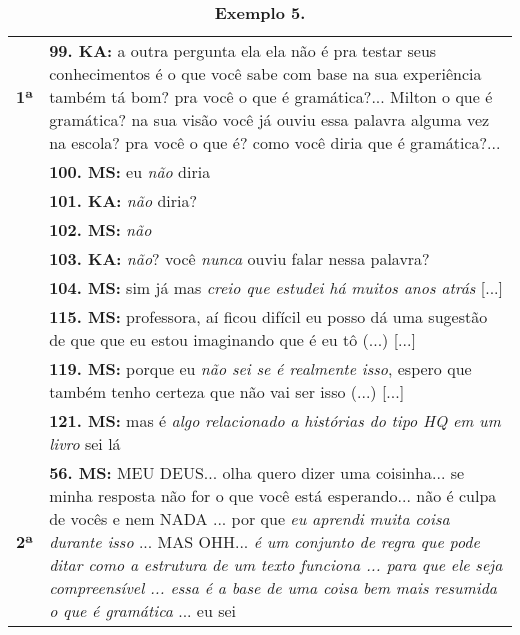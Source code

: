 \begin{table}[!htpb]
\centering
\small
	\begin{threeparttable}
		\caption*{\textbf{Exemplo 5.} }
		\label{tab-06}
		\begin{tabular}{@{} 
				>{\raggedright\arraybackslash}p{} 
				>{\raggedright\arraybackslash}p{} @{}}
			\toprule\noalign{}
\multirow{2}{*}{Milton Santos: compreensão de gramática} \linebreak
			\\
			\midrule\noalign{}
			
			
			
			
			\textbf{1ª } & \textbf{99. KA: }a outra pergunta ela ela não é pra testar seus conhecimentos é o que você sabe com base na sua experiência também tá bom? pra você o que é gramática?... Milton o que é gramática? na sua visão você já ouviu essa palavra alguma vez na escola? pra você o que é? como você diria que é gramática?... \\
			
			& \textbf{100. MS: }eu \emph{não} diria \\
			
			& \textbf{101. KA: }\emph{não} diria? \\
			
			& \textbf{102. MS: }\emph{não} \\
			
			& \textbf{103. KA: }\emph{não}? você \emph{nunca} ouviu falar nessa palavra? \\
			
			& \textbf{104. MS: }sim já mas \emph{creio que estudei há muitos anos atrás} {[}...{]} \\
			
			& \textbf{115. MS: } professora, aí ficou difícil eu posso dá uma sugestão de que que eu estou imaginando que é eu tô (...) {[}...{]} \\
			
			& \textbf{119. MS: } porque eu \emph{não sei se é realmente isso}, espero que também tenho certeza que não vai ser isso (...) {[}...{]} \\
			
			& \textbf{121. MS: }mas é \emph{algo relacionado a histórias do tipo HQ em um livro} sei lá \\
            \midrule
			
			\textbf{2ª } & \textbf{56. MS:} MEU DEUS... olha quero dizer uma coisinha... se minha resposta não for o que você está esperando... não é culpa de vocês e nem NADA ... por que \emph{eu aprendi muita coisa durante isso} ... MAS OHH... \emph{é um conjunto de regra que pode ditar como a estrutura de um texto funciona ... para que ele seja compreensível ... essa é a base de uma coisa bem mais resumida o que é gramática} ... eu sei \\
			

\end{tabular}
\end{threeparttable}
\end{table}

